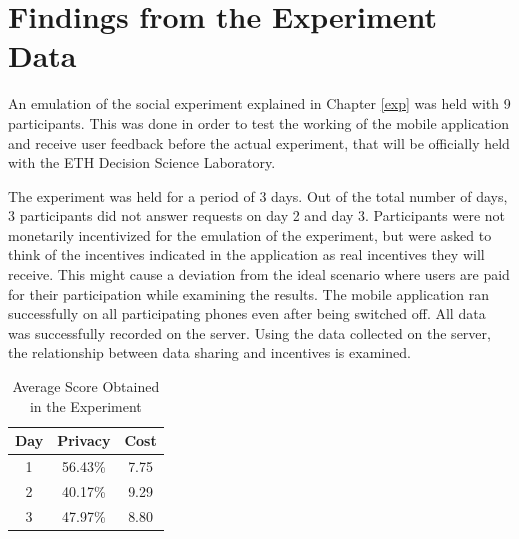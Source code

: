 \section{Findings from the Experiment Data}


An emulation of the social experiment explained in Chapter \ref{exp} was held with 9 participants. This was done in order to test the working of the mobile application and receive user feedback before the actual experiment, that will be officially held with the ETH Decision Science Laboratory.

The experiment was held for a period of 3 days. Out of the total number of days, 3 participants did not answer requests on day 2 and day 3. Participants were not monetarily incentivized for the emulation of the experiment, but were asked to think of the incentives indicated in the application as real incentives they will receive. This might cause a deviation from the ideal scenario where users are paid for their participation while examining the results. The mobile application ran successfully on all participating phones even after being switched off. All data was successfully recorded on the server. Using the data collected on the server, the relationship between data sharing and incentives is examined.

\begin{table}[h!]
  \centering
  \caption{Average Score Obtained in the Experiment}
  \label{tab:score}
  \begin{tabular}{ccc}
    \toprule
    Day&Privacy&Cost \\
    \midrule
	1&56.43\%&7.75\\
	2&40.17\%&9.29\\
	3&47.97\%&8.80\\
\bottomrule
  \end{tabular}
\end{table} 

